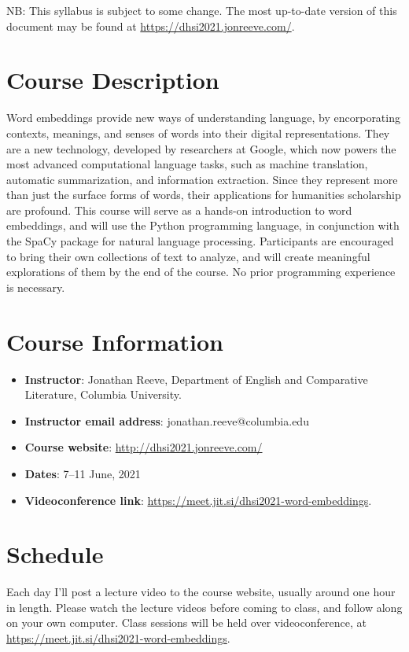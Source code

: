 \documentclass[a4paper]{report}
\begin{document}
NB: This syllabus is subject to some change. The most up-to-date version of this document may be found at \url{https://dhsi2021.jonreeve.com/}.

\section{Course Description}

Word embeddings provide new ways of understanding language, by encorporating contexts, meanings, and senses of words into their digital representations. They are a new technology, developed by researchers at Google, which now powers the most advanced computational language tasks, such as machine translation, automatic summarization, and information extraction. Since they represent more than just the surface forms of words, their applications for humanities scholarship are profound. This course will serve as a hands-on introduction to word embeddings, and will use the Python programming language, in conjunction with the SpaCy package for natural language processing. Participants are encouraged to bring their own collections of text to analyze, and will create meaningful explorations of them by the end of the course. No prior programming experience is necessary.

\section{Course Information}

\begin{itemize}
\item \textbf{Instructor}: Jonathan Reeve, Department of English and Comparative Literature, Columbia University.
\item \textbf{Instructor email address}: jonathan.reeve@columbia.edu
\item \textbf{Course website}: \url{http://dhsi2021.jonreeve.com/}
\item \textbf{Dates}: 7–11 June, 2021
\item \textbf{Videoconference link}: \url{https://meet.jit.si/dhsi2021-word-embeddings}.

\end{itemize}

\section{Schedule}

Each day I'll post a lecture video to the course website, usually around one hour in length. Please watch the lecture videos before coming to class, and follow along on your own computer. Class sessions will be held over videoconference, at \url{https://meet.jit.si/dhsi2021-word-embeddings}.
\end{document}
